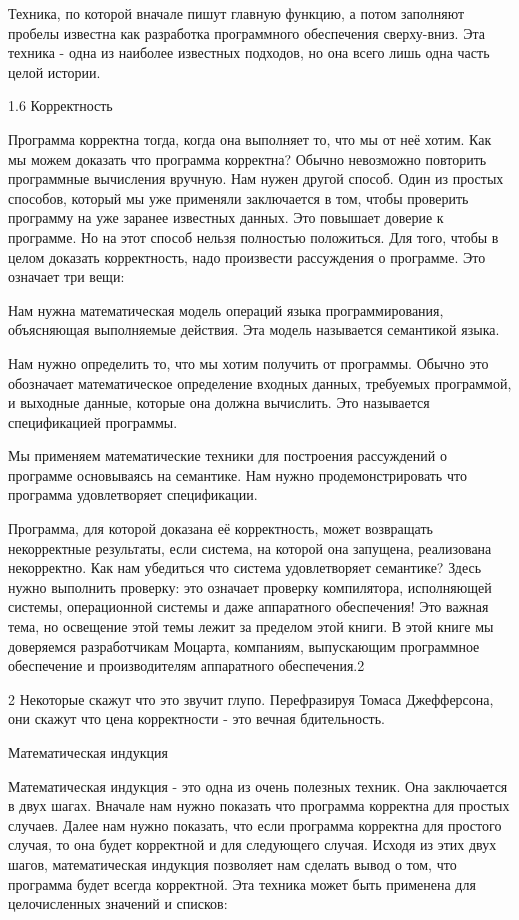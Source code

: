 Техника, по которой вначале пишут главную функцию, а потом заполняют пробелы известна как разработка программного обеспечения сверху-вниз. Эта техника - одна из наиболее известных подходов, но она всего лишь одна часть целой истории.

1.6 Корректность

Программа корректна тогда, когда она выполняет то, что мы от неё хотим. Как мы можем доказать что программа корректна? Обычно невозможно повторить программные вычисления вручную. Нам нужен другой способ. Один из простых способов, который мы уже применяли заключается в том, чтобы проверить программу на уже заранее известных данных. Это повышает доверие к программе. Но на этот способ нельзя полностью положиться. Для того, чтобы в целом доказать корректность, надо произвести рассуждения о программе. Это означает три вещи:

Нам нужна математическая модель операций языка программирования, объясняющая выполняемые действия. Эта модель называется семантикой языка.

Нам нужно определить то, что мы хотим получить от программы. Обычно это обозначает математическое определение входных данных, требуемых программой, и выходные данные, которые она должна вычислить. Это называется спецификацией программы.

Мы применяем математические техники для построения рассуждений о программе основываясь на семантике. Нам нужно продемонстрировать что программа удовлетворяет спецификации.

Программа, для которой доказана её корректность, может возвращать некорректные результаты, если система, на которой она запущена, реализована некорректно. Как нам убедиться что система удовлетворяет семантике? Здесь нужно выполнить проверку: это означает проверку компилятора, исполняющей системы, операционной системы и даже аппаратного обеспечения! Это важная тема, но освещение этой темы лежит за пределом этой книги. В этой книге мы доверяемся разработчикам Моцарта, компаниям, выпускающим программное обеспечение и производителям аппаратного обеспечения.2

2 Некоторые скажут что это звучит глупо. Перефразируя Томаса Джефферсона, они скажут что цена корректности - это вечная бдительность.

Математическая индукция

Математическая индукция - это одна из очень полезных техник. Она заключается в двух шагах. Вначале нам нужно показать что программа корректна для простых случаев. Далее нам нужно показать, что если программа корректна для простого случая, то она будет корректной и для следующего случая. Исходя из этих двух шагов, математическая индукция позволяет нам сделать вывод о том, что программа будет всегда корректной. Эта техника может быть применена для целочисленных значений и списков:


